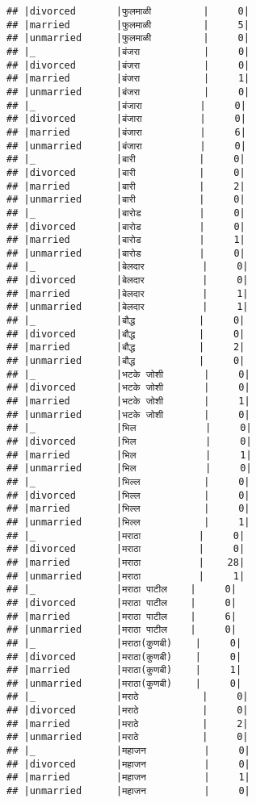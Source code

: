 \documentclass[
]{article}
\begin{document}
\begin{verbatim}
## |divorced       |फुलमाळी         |     0|
## |married        |फुलमाळी         |     5|
## |unmarried      |फुलमाळी         |     0|
## |_              |बंजरा           |     0|
## |divorced       |बंजरा           |     0|
## |married        |बंजरा           |     1|
## |unmarried      |बंजरा           |     0|
## |_              |बंजारा          |     0|
## |divorced       |बंजारा          |     0|
## |married        |बंजारा          |     6|
## |unmarried      |बंजारा          |     0|
## |_              |बारी           |     0|
## |divorced       |बारी           |     0|
## |married        |बारी           |     2|
## |unmarried      |बारी           |     0|
## |_              |बारोड          |     0|
## |divorced       |बारोड          |     0|
## |married        |बारोड          |     1|
## |unmarried      |बारोड          |     0|
## |_              |बेलदार          |     0|
## |divorced       |बेलदार          |     0|
## |married        |बेलदार          |     1|
## |unmarried      |बेलदार          |     1|
## |_              |बौद्ध           |     0|
## |divorced       |बौद्ध           |     0|
## |married        |बौद्ध           |     2|
## |unmarried      |बौद्ध           |     0|
## |_              |भटके जोशी       |     0|
## |divorced       |भटके जोशी       |     0|
## |married        |भटके जोशी       |     1|
## |unmarried      |भटके जोशी       |     0|
## |_              |भिल            |     0|
## |divorced       |भिल            |     0|
## |married        |भिल            |     1|
## |unmarried      |भिल            |     0|
## |_              |भिल्ल           |     0|
## |divorced       |भिल्ल           |     0|
## |married        |भिल्ल           |     0|
## |unmarried      |भिल्ल           |     1|
## |_              |मराठा          |     0|
## |divorced       |मराठा          |     0|
## |married        |मराठा          |    28|
## |unmarried      |मराठा          |     1|
## |_              |मराठा पाटील    |     0|
## |divorced       |मराठा पाटील    |     0|
## |married        |मराठा पाटील    |     6|
## |unmarried      |मराठा पाटील    |     0|
## |_              |मराठा(कुणबी)    |     0|
## |divorced       |मराठा(कुणबी)    |     0|
## |married        |मराठा(कुणबी)    |     1|
## |unmarried      |मराठा(कुणबी)    |     0|
## |_              |मराठे           |     0|
## |divorced       |मराठे           |     0|
## |married        |मराठे           |     2|
## |unmarried      |मराठे           |     0|
## |_              |महाजन          |     0|
## |divorced       |महाजन          |     0|
## |married        |महाजन          |     1|
## |unmarried      |महाजन          |     0|

\end{verbatim}
\end{document}
